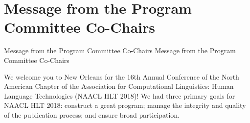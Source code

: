 \section{Message from the Program Committee Co-Chairs}\vspace{2em}
\setheaders%
    {Message from the Program Committee Co-Chairs}%
    {Message from the Program Committee Co-Chairs}
\thispagestyle{emptyheader}

\setlength{\parskip}{.7ex}


We welcome you to New Orleans for the 16th Annual Conference of the North American Chapter of the Association for Computational Linguistics: Human Language Technologies (NAACL HLT 2018)! We had three primary goals for NAACL HLT 2018: construct a great program; manage the integrity and quality of the publication process; and ensure broad participation.


